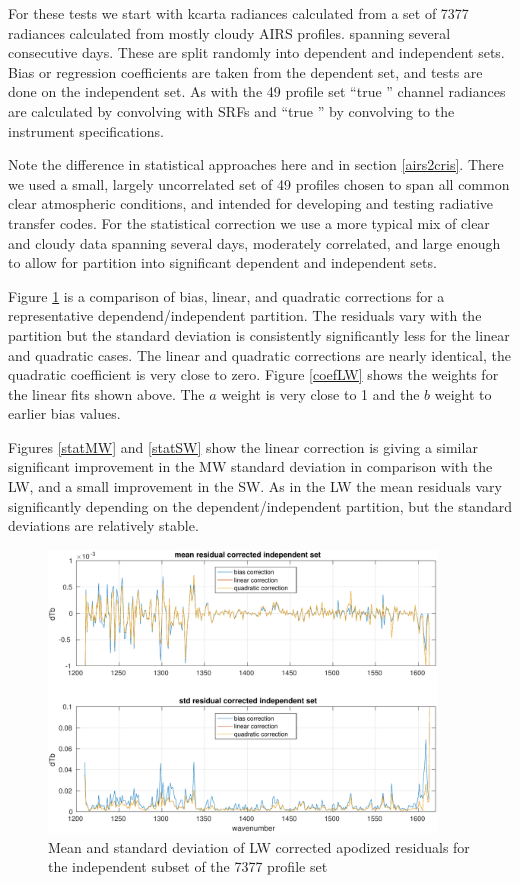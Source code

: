 \documentclass[11pt]{article}
\begin{document}
For these tests we start with kcarta radiances calculated from a 
set of 7377 radiances calculated from mostly cloudy AIRS profiles.
spanning several consecutive days.  These are split randomly into
dependent and independent sets.  Bias or regression coefficients are
taken from the dependent set, and tests are done on the independent
set.  As with the 49 profile set ``true {\airs}'' channel radiances
are calculated by convolving with {\airs} SRFs and ``true {\cris}''
by convolving to the {\cris} instrument specifications.

Note the difference in statistical approaches here and in section
\ref{airs2cris}.  There we used a small, largely uncorrelated set of
49 profiles chosen to span all common clear atmospheric conditions,
and intended for developing and testing radiative transfer codes.
For the statistical correction we use a more typical mix of clear
and cloudy data spanning several days, moderately correlated, and
large enough to allow for partition into significant dependent and
independent sets.

Figure \ref{statLW} is a comparison of bias, linear, and quadratic
corrections for a representative dependend/independent partition.
The residuals vary with the partition but the standard deviation is
consistently significantly less for the linear and quadratic cases.
The linear and quadratic corrections are nearly identical, the
quadratic coefficient is very close to zero.  Figure \ref{coefLW}
shows the weights for the linear fits shown above.  The $a$ weight
is very close to 1 and the $b$ weight to earlier bias values.

Figures \ref{statMW} and \ref{statSW} show the linear correction 
is giving a similar significant improvement in the MW standard
deviation in comparison with the LW, and a small improvement in the
SW.  As in the LW the mean residuals vary significantly depending on
the dependent/independent partition, but the standard deviations are
relatively stable.

\begin{figure} %
  \centering
  \includegraphics[height=7.5cm]{figures/a2cris_stat_LW.pdf}
  \caption{Mean and standard deviation of LW corrected apodized
    residuals for the independent subset of the 7377 profile set}
  \label{statLW}
\end{figure}
\end{document}
